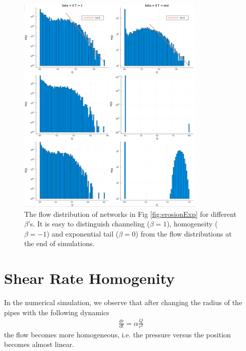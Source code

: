 \begin{figure}
    \centering
    \includegraphics[width = 0.8\textwidth]{Figs/PQ.png}
    \caption{The flow distribution of networks in Fig \ref{fig:erosionExp} for different $\beta$'s. It is easy to distinguish channeling ($\beta = 1$), homogeneity ($\beta = -1$) and exponential tail ($\beta = 0$) from the flow distributions at the end of simulations.  }
    \label{fig:PQ}
\end{figure}









\section{Shear Rate Homogenity}
%
In the numerical simulation, we observe that after changing the radius
of the pipes with the following dynamics 
%
\begin{align}
  \frac{d r}{dt } = \alpha \frac{Q}{r^{3}} 
\end{align}
%
the flow becomes more homogeneous, i.e. the pressure versus the
position becomes almost linear.

